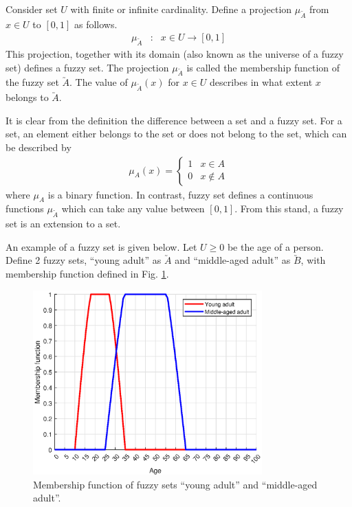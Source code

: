 Consider set $U$ with finite or infinite cardinality. Define a projection $\mu_{\utilde{A}}$ from $x \in U$ to $[0, 1]$ as follows.
\begin{eqnarray}
	\mu_{\utilde{A}} &:& x \in U \rightarrow [0, 1] \nonumber
\end{eqnarray}
This projection, together with its domain (also known as the universe of a fuzzy set) defines a fuzzy set. The projection $\mu_{\utilde{A}}$ is called the membership function of the fuzzy set $\utilde{A}$. The value of $\mu_{\utilde{A}}(x)$ for $x \in U$ describes in what extent $x$ belongs to $\utilde{A}$.

It is clear from the definition the difference between a set and a fuzzy set. For a set, an element either belongs to the set or does not belong to the set, which can be described by
\begin{eqnarray}
	\mu_{A}(x) = \left\{\begin{array}{cc}
		1 & x \in A \\
		0 & x \notin A
	\end{array}\right. \nonumber
\end{eqnarray}
where $\mu_{A}$ is a binary function. In contrast, fuzzy set defines a continuous functions $\mu_{\utilde{A}}$ which can take any value between $[0,1]$. From this stand, a fuzzy set is an extension to a set.

An example of a fuzzy set is given below. Let $U\geq 0$ be the age of a person. Define 2 fuzzy sets, ``young adult'' as $\utilde{A}$ and ``middle-aged adult'' as $\utilde{B}$, with membership function defined in Fig. \ref{ch:fcs:fig:fuzzysetexp}.

\begin{figure}
	\centering
	\includegraphics[width=250pt]{chapters/ch-fuzzy-control-system/figures/fuzzysetexp.eps}
	\caption{Membership function of fuzzy sets ``young adult'' and ``middle-aged adult''.} \label{ch:fcs:fig:fuzzysetexp}
\end{figure}

